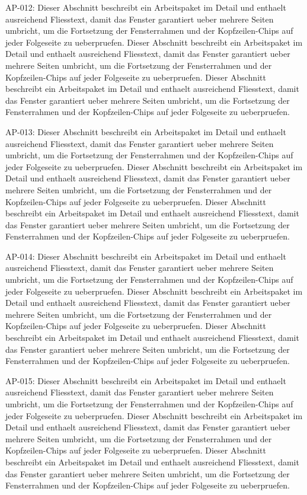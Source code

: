 \documentclass[type=report,theme=light,language=de]{semio}
\begin{document}
\begin{Table}[title=Lange Tabelle]
AP-012: Dieser Abschnitt beschreibt ein Arbeitspaket im Detail und enthaelt ausreichend Fliesstext, damit das Fenster garantiert ueber mehrere Seiten umbricht, um die Fortsetzung der Fensterrahmen und der Kopfzeilen-Chips auf jeder Folgeseite zu ueberpruefen. Dieser Abschnitt beschreibt ein Arbeitspaket im Detail und enthaelt ausreichend Fliesstext, damit das Fenster garantiert ueber mehrere Seiten umbricht, um die Fortsetzung der Fensterrahmen und der Kopfzeilen-Chips auf jeder Folgeseite zu ueberpruefen. Dieser Abschnitt beschreibt ein Arbeitspaket im Detail und enthaelt ausreichend Fliesstext, damit das Fenster garantiert ueber mehrere Seiten umbricht, um die Fortsetzung der Fensterrahmen und der Kopfzeilen-Chips auf jeder Folgeseite zu ueberpruefen. 

AP-013: Dieser Abschnitt beschreibt ein Arbeitspaket im Detail und enthaelt ausreichend Fliesstext, damit das Fenster garantiert ueber mehrere Seiten umbricht, um die Fortsetzung der Fensterrahmen und der Kopfzeilen-Chips auf jeder Folgeseite zu ueberpruefen. Dieser Abschnitt beschreibt ein Arbeitspaket im Detail und enthaelt ausreichend Fliesstext, damit das Fenster garantiert ueber mehrere Seiten umbricht, um die Fortsetzung der Fensterrahmen und der Kopfzeilen-Chips auf jeder Folgeseite zu ueberpruefen. Dieser Abschnitt beschreibt ein Arbeitspaket im Detail und enthaelt ausreichend Fliesstext, damit das Fenster garantiert ueber mehrere Seiten umbricht, um die Fortsetzung der Fensterrahmen und der Kopfzeilen-Chips auf jeder Folgeseite zu ueberpruefen. 

AP-014: Dieser Abschnitt beschreibt ein Arbeitspaket im Detail und enthaelt ausreichend Fliesstext, damit das Fenster garantiert ueber mehrere Seiten umbricht, um die Fortsetzung der Fensterrahmen und der Kopfzeilen-Chips auf jeder Folgeseite zu ueberpruefen. Dieser Abschnitt beschreibt ein Arbeitspaket im Detail und enthaelt ausreichend Fliesstext, damit das Fenster garantiert ueber mehrere Seiten umbricht, um die Fortsetzung der Fensterrahmen und der Kopfzeilen-Chips auf jeder Folgeseite zu ueberpruefen. Dieser Abschnitt beschreibt ein Arbeitspaket im Detail und enthaelt ausreichend Fliesstext, damit das Fenster garantiert ueber mehrere Seiten umbricht, um die Fortsetzung der Fensterrahmen und der Kopfzeilen-Chips auf jeder Folgeseite zu ueberpruefen. 

AP-015: Dieser Abschnitt beschreibt ein Arbeitspaket im Detail und enthaelt ausreichend Fliesstext, damit das Fenster garantiert ueber mehrere Seiten umbricht, um die Fortsetzung der Fensterrahmen und der Kopfzeilen-Chips auf jeder Folgeseite zu ueberpruefen. Dieser Abschnitt beschreibt ein Arbeitspaket im Detail und enthaelt ausreichend Fliesstext, damit das Fenster garantiert ueber mehrere Seiten umbricht, um die Fortsetzung der Fensterrahmen und der Kopfzeilen-Chips auf jeder Folgeseite zu ueberpruefen. Dieser Abschnitt beschreibt ein Arbeitspaket im Detail und enthaelt ausreichend Fliesstext, damit das Fenster garantiert ueber mehrere Seiten umbricht, um die Fortsetzung der Fensterrahmen und der Kopfzeilen-Chips auf jeder Folgeseite zu ueberpruefen. 


\end{Table}
\end{document}
